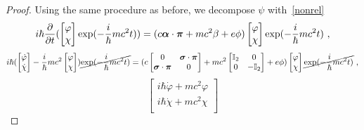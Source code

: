 \begin{proof}
        Using the same procedure as before, we decompose $\psi$ with~\eqref{nonrel} 
        \begin{equation*}
            i \hbar \frac{\partial}{\partial t} (\begin{bmatrix}
                \varphi \\ \chi \\
            \end{bmatrix} \exp(- \frac{i}{\hbar} m c^2 t)) = (c \boldsymbol \alpha \cdot \boldsymbol \pi + m c^2 \beta + e \phi) \begin{bmatrix}
                \varphi \\ \chi \\
            \end{bmatrix} \exp(- \frac{i}{\hbar} m c^2 t) ~,
        \end{equation*}
        \begin{equation*}
            i \hbar (\begin{bmatrix}
                \dot \varphi \\ \dot \chi \\
            \end{bmatrix} - \frac{i}{\hbar} m c^2 \begin{bmatrix}
                \varphi \\ \chi \\
            \end{bmatrix} ) \cancel{\exp(- \frac{i}{\hbar} m c^2 t)} = (c \begin{bmatrix}
                0 & \boldsymbol \sigma \cdot \boldsymbol \pi \\
                \boldsymbol \sigma \cdot \boldsymbol \pi & 0 \\
            \end{bmatrix} + m c^2 \begin{bmatrix}
                \mathbb I_2 & 0 \\ 0 & -\mathbb I_2 \\
            \end{bmatrix} + e \phi) \begin{bmatrix}
                \varphi \\ \chi \\
            \end{bmatrix} \cancel{\exp(- \frac{i}{\hbar} m c^2 t)} ~,
        \end{equation*}
        \begin{equation*}
            \begin{bmatrix}
                i \hbar \dot \varphi + m c^2 \varphi \\ i \hbar \dot \chi + m c^2 \chi \\

\end{bmatrix}
\end{equation*}
\end{proof}
